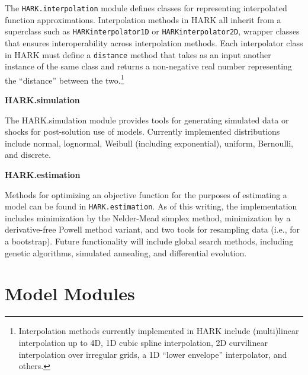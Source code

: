 \message{ !name(ccarroll_et_al_scipy_2018.tex)}\documentclass[10pt,twocolumn]{article}
\let\rmarkdownfootnote\footnote%
\def\footnote{\protect\rmarkdownfootnote}
\begin{document}
The \texttt{HARK.interpolation} module defines classes for representing interpolated function approximations. Interpolation methods in HARK all inherit from a superclass such as \texttt{HARKinterpolator1D} or \texttt{HARKinterpolator2D}, wrapper classes that ensures interoperability across interpolation methods. Each interpolator class in HARK must define a \texttt{distance} method that takes as an input another instance of the same class and returns a non-negative real number representing the ``distance'' between the two.\footnote{Interpolation methods currently implemented in HARK include (multi)linear interpolation up to 4D, 1D cubic spline interpolation, 2D curvilinear interpolation over irregular grids, a 1D ``lower envelope'' interpolator, and others.}

\textbf{HARK.simulation}

The HARK.simulation module provides tools for generating simulated data
or shocks for post-solution use of models. Currently implemented
distributions include normal, lognormal, Weibull (including
exponential), uniform, Bernoulli, and discrete.

\textbf{HARK.estimation}

Methods for optimizing an objective function for the purposes of estimating a model can be found in \texttt{HARK.estimation}. As of this writing, the implementation includes minimization by the Nelder-Mead simplex method, minimization by a derivative-free Powell method variant, and two tools for resampling data (i.e., for a bootstrap). Future functionality will include global search methods, including genetic algorithms, simulated annealing, and differential evolution.

\section{\texorpdfstring{Model Modules
\label{sec:model-modules}}{Model Modules }}\label{model-modules}
\end{document}
